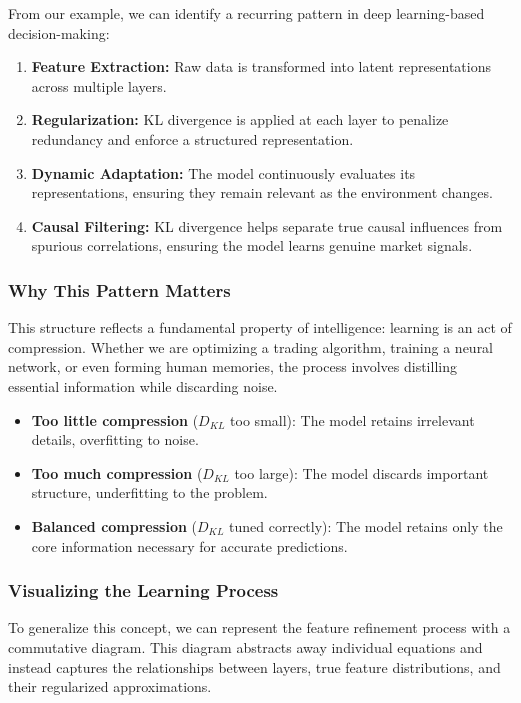 From our example, we can identify a recurring pattern in deep learning-based decision-making:

\begin{enumerate}
    \item \textbf{Feature Extraction:} Raw data is transformed into latent representations across multiple layers.
    \item \textbf{Regularization:} KL divergence is applied at each layer to penalize redundancy and enforce a structured representation.
    \item \textbf{Dynamic Adaptation:} The model continuously evaluates its representations, ensuring they remain relevant as the environment changes.
    \item \textbf{Causal Filtering:} KL divergence helps separate true causal influences from spurious correlations, ensuring the model learns genuine market signals.
\end{enumerate}

\subsubsection*{Why This Pattern Matters}

This structure reflects a fundamental property of intelligence: learning is an act of compression. Whether we are optimizing a trading algorithm, training a neural network, or even forming human memories, the process involves distilling essential information while discarding noise. 

\begin{itemize}
    \item \textbf{Too little compression} (\( D_{KL} \) too small): The model retains irrelevant details, overfitting to noise.
    \item \textbf{Too much compression} (\( D_{KL} \) too large): The model discards important structure, underfitting to the problem.
    \item \textbf{Balanced compression} (\( D_{KL} \) tuned correctly): The model retains only the core information necessary for accurate predictions.
\end{itemize}

\subsubsection*{Visualizing the Learning Process}

To generalize this concept, we can represent the feature refinement process with a commutative diagram. This diagram abstracts away individual equations and instead captures the relationships between layers, true feature distributions, and their regularized approximations.

